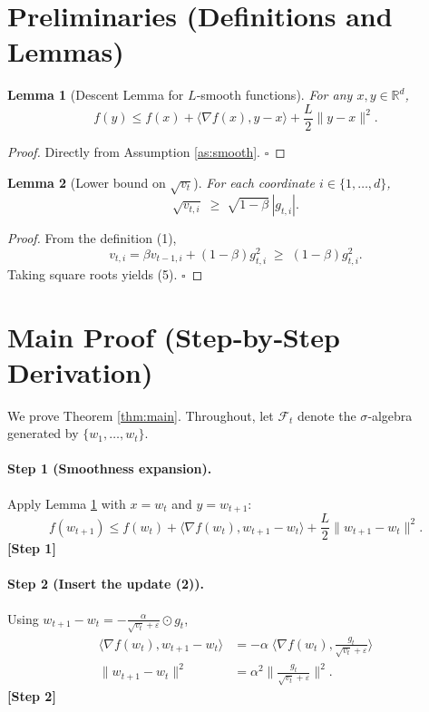 \documentclass{article}
\newtheorem{lemma}{Lemma}
\newcommand{\R}{\mathbb{R}}
\newcommand{\ip}[2]{\langle #1,#2\rangle}
\begin{document}
\newpage
\section*{Preliminaries (Definitions and Lemmas)}
\begin{lemma}[Descent Lemma for $L$‑smooth functions]\label{lem:descent}
For any $x,y\in\R^{d}$,
\[
f(y)\le f(x)+\ip{\nabla f(x)}{y-x}+\frac{L}{2}\|y-x\|^{2}.
\]
\end{lemma}
\begin{proof}
Directly from Assumption \ref{as:smooth}. \hfill $\square$
\end{proof}

\begin{lemma}[Lower bound on $\sqrt{v_{t}}$]\label{lem:vt}
For each coordinate $i\in\{1,\dots,d\}$,
\[
\sqrt{v_{t,i}}\;\ge\;\sqrt{1-\beta}\,|g_{t,i}|.
\tag{5}
\]
\end{lemma}
\begin{proof}
From the definition (1),
\[
v_{t,i}= \beta v_{t-1,i}+(1-\beta)g_{t,i}^{2}
\;\ge\;(1-\beta)g_{t,i}^{2}.
\]
Taking square roots yields (5). \hfill $\square$
\end{proof}

\section*{Main Proof (Step‑by‑Step Derivation)}
We prove Theorem \ref{thm:main}.  Throughout, let $\mathcal F_{t}$ denote the $\sigma$‑algebra generated by $\{w_{1},\dots,w_{t}\}$.

\paragraph{Step 1 (Smoothness expansion).}  
Apply Lemma \ref{lem:descent} with $x=w_{t}$ and $y=w_{t+1}$:
\[
f(w_{t+1})\le f(w_{t})+\ip{\nabla f(w_{t})}{w_{t+1}-w_{t}}
+\frac{L}{2}\|w_{t+1}-w_{t}\|^{2}.
\tag{6}
\]
\textbf{[Step 1]}

\paragraph{Step 2 (Insert the update (2)).}  
Using $w_{t+1}-w_{t}= -\displaystyle\frac{\alpha}{\sqrt{v_{t}}+\varepsilon}\odot g_{t}$,
\[
\begin{aligned}
\ip{\nabla f(w_{t})}{w_{t+1}-w_{t}}
&= -\alpha\;\ip{\nabla f(w_{t})}{\frac{g_{t}}{\sqrt{v_{t}}+\varepsilon}}\\[2mm]
\|w_{t+1}-w_{t}\|^{2}
&= \alpha^{2}\Big\|\frac{g_{t}}{\sqrt{v_{t}}+\varepsilon}\Big\|^{2}.
\end{aligned}
\tag{7}
\]
\textbf{[Step 2]}
\end{document}
